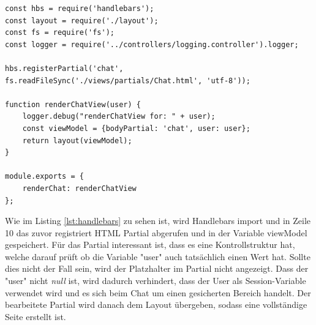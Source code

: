 
\begin{lstlisting}
const hbs = require('handlebars');
const layout = require('./layout');
const fs = require('fs');
const logger = require('../controllers/logging.controller').logger;

hbs.registerPartial('chat', fs.readFileSync('./views/partials/Chat.html', 'utf-8'));

function renderChatView(user) {
    logger.debug("renderChatView for: " + user);
    const viewModel = {bodyPartial: 'chat', user: user};
    return layout(viewModel);
}

module.exports = {
    renderChat: renderChatView
};
\end{lstlisting}

Wie im Listing \ref{lst:handlebars} zu sehen ist, wird Handlebars import und in Zeile 10 das zuvor registriert HTML Partial abgerufen und in der Variable viewModel gespeichert. Für das Partial interessant ist, dass es eine Kontrollstruktur hat, welche darauf prüft ob die Variable "user" auch tatsächlich einen Wert hat. Sollte dies nicht der Fall sein, wird der Platzhalter im Partial nicht angezeigt. Dass der "user" nicht \textit{null} ist, wird dadurch verhindert, dass der User als Session-Variable verwendet wird und es sich beim Chat um einen gesicherten Bereich handelt. Der bearbeitete Partial wird danach dem Layout übergeben, sodass eine vollständige Seite erstellt ist. 



